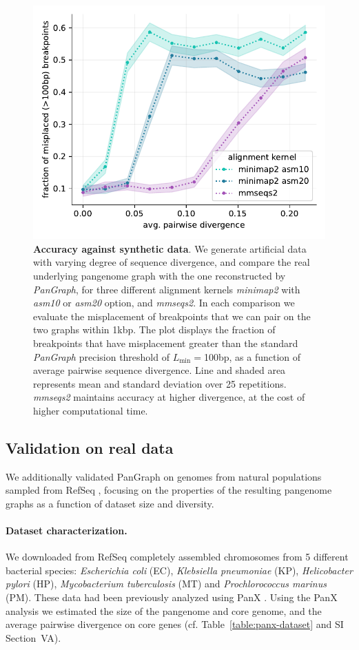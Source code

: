 \documentclass[aps,rmp,preprint,superscriptaddress,10pt,linenumbers]{revtex4-1}
\newcommand{\Lthr}{L_{\min}}
\newcommand{\SIdataBenchmark}{V}
\begin{document}
\begin{figure}[tb]
    \includegraphics[width=.4\textwidth]{figs/misplaced_fraction_vs_divergence.pdf}
    \caption{{\bf Accuracy against synthetic data}.
        We generate artificial data with varying degree of sequence divergence, and compare the real underlying pangenome graph with the one reconstructed by \textit{PanGraph}, for three different alignment kernels \textit{minimap2} with \textit{asm10} or \textit{asm20} option, and \textit{mmseqs2}. In each comparison we evaluate the misplacement of breakpoints that we can pair on the two graphs within 1kbp. The plot displays the fraction of breakpoints that have misplacement greater than the standard \textit{PanGraph} precision threshold of $\Lthr=$100bp, as a function of average pairwise sequence divergence. Line and shaded area represents mean and standard deviation over 25 repetitions. \textit{mmseqs2} maintains accuracy at higher divergence, at the cost of higher computational time.
    }
    \label{fig:toy-accuracy}
\end{figure}


\subsection{Validation on real data}

We additionally validated PanGraph on genomes from natural populations sampled from RefSeq \cite{o2016reference}, focusing on the properties of the resulting pangenome graphs as a function of dataset size and diversity.

\paragraph*{Dataset characterization.}
We downloaded from RefSeq \cite{o2016reference} completely assembled chromosomes from 5 different bacterial species: \textit{Escherichia coli} (EC), \textit{Klebsiella pneumoniae} (KP), \textit{Helicobacter pylori} (HP), \textit{Mycobacterium tuberculosis} (MT) and \textit{Prochlorococcus marinus} (PM). These data had been previously analyzed using PanX \cite{ding2018panx}. Using the PanX analysis we estimated the size of the pangenome and core genome, and the average pairwise divergence on core genes (cf. Table~\ref{table:panx-dataset} and SI Section~{\SIdataBenchmark}A).
\end{document}
